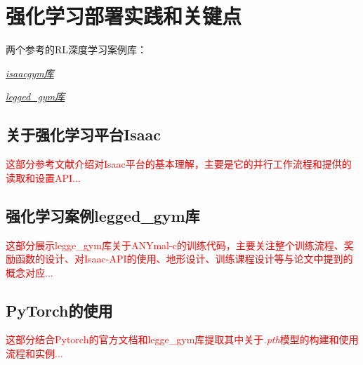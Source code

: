 
\chapter{强化学习部署实践和关键点}
\begin{note}
  两个参考的RL深度学习案例库：

  \emph{\href{https://github.com/DaojiePENG}{isaacgym库}}

  \emph{\href{https://github.com/DaojiePENG}{legged\_gym库}}
\end{note}

\section[强化学习平台Isaac]{关于强化学习平台Isaac\cite[p6-10]{Makoviychuk_Wawrzyniak_Guo_Lu_Storey_Macklin_Hoeller_Rudin_Allshire_Handa_et_al_2021}}

\textcolor{red}{\small
这部分参考文献介绍对Isaac平台的基本理解，主要是它的并行工作流程和提供的读取和设置API...}

\section[强化学习案例legged\_gym库]{强化学习案例legged\_gym库\cite[p1]{Rudin_Hoeller_Reist_Hutter_2021}}

\textcolor{red}{\small
这部分展示legge\_gym库关于ANYmal-c的训练代码，主要关注整个训练流程、奖励函数的设计、对Isaac-API的使用、地形设计、训练课程设计等与论文中提到的概念对应...}

\section[PyTorch的使用]{PyTorch的使用}
\textcolor{red}{\small
这部分结合Pytorch的官方文档和legge\_gym库提取其中关于\emph{.pth}模型的构建和使用流程和实例...
}